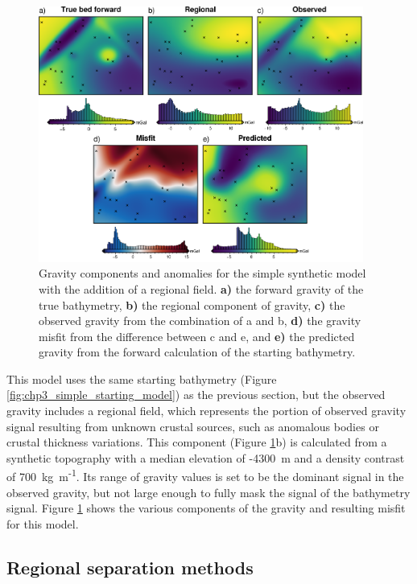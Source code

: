 \begin{figure}[!ht]
    \centering
    \includegraphics[width=0.95\textwidth]{figures/chp3/chp3_simple_regional_gravity.png}
    \caption[Gravity anomalies with a regional field]{Gravity components and anomalies for the simple synthetic model with the addition of a regional field. \textbf{a)} the forward gravity of the true bathymetry, \textbf{b)} the regional component of gravity, \textbf{c)} the observed gravity from the combination of a and b, \textbf{d)} the gravity misfit from the difference between c and e, and \textbf{e)} the predicted gravity from the forward calculation of the starting bathymetry.}
    \label{fig:chp3_simple_regional_gravity}
\end{figure}

This model uses the same starting bathymetry (Figure \ref{fig:chp3_simple_starting_model}) as the previous section, but the observed gravity includes a regional field, which represents the portion of observed gravity signal resulting from unknown crustal sources, such as anomalous bodies or crustal thickness variations. This component (Figure \ref{fig:chp3_simple_regional_gravity}b) is calculated from a synthetic topography with a median elevation of -4300~m and a density contrast of 700~kg~m\textsuperscript{-1}. Its range of gravity values is set to be the dominant signal in the observed gravity, but not large enough to fully mask the signal of the bathymetry signal. Figure \ref{fig:chp3_simple_regional_gravity} shows the various components of the gravity and resulting misfit for this model. 

\subsection{Regional separation methods}

